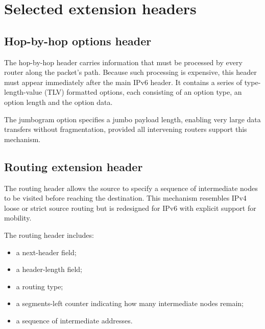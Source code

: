 \section{Selected extension headers}

\subsection{Hop-by-hop options header}

The hop-by-hop header carries information that must be processed by every router along the packet's path. Because such processing is expensive, this header must appear immediately after the main IPv6 header. It contains a series of type-length-value (TLV) formatted options, each consisting of an option type, an option length and the option data.

The jumbogram option specifies a jumbo payload length, enabling very large data transfers without fragmentation, provided all intervening routers support this mechanism.

\begin{center}
\end{center}

\begin{center}
\end{center}

\subsection{Routing extension header}

The routing header allows the source to specify a sequence of intermediate nodes to be visited before reaching the destination. This mechanism resembles IPv4 loose or strict source routing but is redesigned for IPv6 with explicit support for mobility.

The routing header includes:

\begin{itemize}
\item a next-header field;
\item a header-length field;
\item a routing type;
\item a segments-left counter indicating how many intermediate nodes remain;
\item a sequence of intermediate addresses.
\end{itemize}

